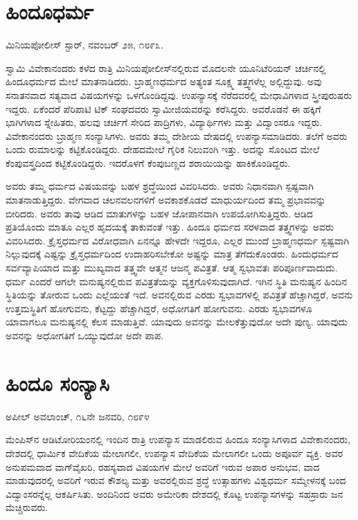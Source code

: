 \section{ಹಿಂದೂಧರ್ಮ}

\begin{flushright}
ಮಿನಿಯಪೋಲೀಸ್ ಸ್ಟಾರ್, ನವಂಬರ್ ೨೫, ೧೮೯೩.
\end{flushright}

 ಸ್ವಾಮಿ ವಿವೇಕಾನಂದರು ಕಳೆದ ರಾತ್ರಿ ಮಿನಿಯಪೋಲೀಸ್‍ನಲ್ಲಿರುವ ಮೊದಲನೇ ಯೂನಿಟೆರಿಯನ್ ಚರ್ಚಿನಲ್ಲಿ ಹಿಂದೂಧರ್ಮದ ಮೇಲೆ ಮಾತನಾಡಿದರು. ಬ್ರಾಹ್ಮಣಧರ್ಮದ ಅತ್ಯಂತ ಸೂಕ್ಷ್ಮ ತತ್ತ್ವಗಳೆಲ್ಲ ಅಲ್ಲಿದ್ದುವು. ಅವು ಸನಾತನವಾದ ಸತ್ಯವಾದ ವಿಷಯಗಳನ್ನು ಒಳಗೊಂಡಿದ್ದವು. ಉಪನ್ಯಾಸಕ್ಕೆ ನೆರೆದವರಲ್ಲಿ ಮೇಧಾವಿಗಳಾದ ಸ್ತ್ರೀಪುರುಷರು ಇದ್ದರು. ಏಕೆಂದರೆ ಪೆರಿಪಾಟಿ ಟಿಕ್ ಸಂಘದವರು ಸ್ವಾಮೀಜಿಯವರನ್ನು ಕರೆಸಿದ್ದರು. ಅವರೊಡನೆ ಈ ಹಕ್ಕಿಗೆ ಭಾಗಿಗಳಾದ ಸ್ನೇಹಿತರು, ಹಲವು ಚರ್ಚಿಗೆ ಸೇರಿದ ಪಾದ್ರಿಗಳು, ವಿದ್ಯಾರ್ಥಿಗಳು ಮತ್ತು ವಿದ್ವಾಂಸರೂ ಇದ್ದರು. ವಿವೇಕಾನಂದರು ಬ್ರಾಹ್ಮಣ ಸಂನ್ಯಾಸಿಗಳು. ಅವರು ತಮ್ಮ ದೇಶೀಯ ವೇಷದಲ್ಲಿ ಉಪನ್ಯಾಸಮಾಡಿದರು. ತಲೆಗೆ ಅವರು ಒಂದು ರುಮಾಲನ್ನು ಕಟ್ಟಿಕೊಂಡಿದ್ದರು. ದೇಹದಮೇಲೆ ಗೈರಿಕ ನಿಲುವಂಗಿ ಇತ್ತು. ಅದನ್ನು ಸೊಂಟದ ಮೇಲೆ ಕೆಂಪುವಸ್ತ್ರದಿಂದ ಕಟ್ಟಿಕೊಂಡಿದ್ದರು. ಇದರೊಳಗೆ ಕೆಂಪುಬಣ್ಣದ ಶರಾಯಿಯನ್ನು ಹಾಕಿಕೊಂಡಿದ್ದರು. 

 ಅವರು ತಮ್ಮ ಧರ್ಮದ ವಿಷಯವನ್ನು ಬಹಳ ಶ್ರದ್ಧೆಯಿಂದ ವಿವರಿಸಿದರು. ಅವರು ನಿಧಾನವಾಗಿ ಸ್ಪಷ್ಟವಾಗಿ ಮಾತನಾಡುತ್ತಿದ್ದರು. ವೇಗವಾದ ಚಲನವಲನಗಳಿಗೆ ಅವಕಾಶಕೊಡದೆ ಮಾಧುರ್ಯದಿಂದ ತಮ್ಮ ಪ್ರಭಾವವನ್ನು ಬೀರಿದರು. ಅವರು ತಾವು ಆಡಿದ ಮಾತುಗಳನ್ನು ಬಹಳ ಜೋಪಾನವಾಗಿ ಉಪಯೋಗಿಸುತ್ತಿದ್ದರು. ಆಡಿದ ಪ್ರತಿಯೊಂದು ಮಾತೂ ಎಲ್ಲರ ಹೃದಯಕ್ಕೆ ತಾಕುವಂತೆ ಇತ್ತು. ಹಿಂದೂ ಧರ್ಮದ ಸರಳವಾದ ತತ್ತ್ವಗಳನ್ನು ಅವರು ವಿವರಿಸಿದರು. ಕ್ರೈಸ್ತಧರ್ಮದ ವಿರೋಧವಾಗಿ ಏನನ್ನೂ ಹೇಳದೇ ಇದ್ದರೂ, ಎಲ್ಲರ ಮುಂದೆ ಬ್ರಾಹ್ಮಣಧರ್ಮ ಸ್ಪಷ್ಟವಾಗಿ ನಿಲ್ಲುವುದಕ್ಕೆ ಎಷ್ಟನ್ನು ಕ್ರೈಸ್ತಧರ್ಮದಿಂದ ಉದಾಹರಿಸಬೇಕೋ ಅಷ್ಟನ್ನು ಮಾತ್ರ ತೆಗೆದುಕೊಂಡರು. ಹಿಂದುಧರ್ಮದ ಸರ್ವವ್ಯಾಪಿಯಾದ ಮತ್ತು ಮುಖ್ಯವಾದ ತತ್ತ್ವವೇ ಆತ್ಮನ ಆಜನ್ಮ ಪವಿತ್ರತೆ. ಆತ್ಮ ಸ್ವಭಾವತಃ ಪರಿಪೂರ್ಣವಾದುದು. ಧರ್ಮ ಎಂದರೆ ಆಗಲೇ ಮನುಷ್ಯನಲ್ಲಿರುವ ಪವಿತ್ರತೆಯನ್ನು ವ್ಯಕ್ತಗೊಳಿಸುವುದಾಗಿದೆ. ಇಗಿನ ಸ್ಥಿತಿ ಮನುಷ್ಯನ ಹಿಂದಿನ ಸ್ಥಿತಿಯನ್ನು ತೋರುವ ಒಂದು ಎಲ್ಲೆಯಂತೆ ಇದೆ. ಅವನಲ್ಲಿರುವ ಎರಡು ಸ್ವಭಾವಗಳಲ್ಲಿ ಪವಿತ್ರತೆ ಹೆಚ್ಚಾಗಿದ್ದರೆ, ಅವನು ಉತ್ತಮಸ್ಥಿತಿಗೆ ಹೋಗುವನು, ಕೆಟ್ಟದ್ದು ಹೆಚ್ಚಾಗಿದ್ದರೆ, ಅಧೋಗತಿಗೆ ಹೋಗುವನು. ಎರಡು ಸ್ವಭಾವಗಳೂ ಯಾವಾಗಲೂ ಮನುಷ್ಯನಲ್ಲಿ ಕೆಲಸ ಮಾಡುತ್ತಿವೆ. ಯಾವುದು ಅವನನ್ನು ಮೇಲಕೆತ್ತುವುದೋ ಅದೇ ಪುಣ್ಯ. ಯಾವುದು ಅವನನ್ನು ಅಧೋಗತಿಗೆ ಒಯ್ಯುವುದೋ ಅದೇ ಪಾಪ.


\section{ಹಿಂದೂ ಸಂನ್ಯಾಸಿ}

\begin{flushright}
ಅಪೀಲ್ ಅವಲಾಂಚ್, ೧೬ನೇ ಜನವರಿ, ೧೮೯೪
\end{flushright}

 ಮೆಂಪಿಸ್‍ನ ಆಡಿಟೋರಿಯಂನಲ್ಲಿ ಇಂದಿನ ರಾತ್ರಿ ಉಪನ್ಯಾಸ ಮಾಡಲಿರುವ ಹಿಂದೂ ಸಂನ್ಯಾಸಿಗಳಾದ ವಿವೇಕಾನಂದರು, ದೇಶದಲ್ಲಿ ಧಾರ್ಮಿಕ ವೇದಿಕೆಯ ಮೇಲಾಗಲೀ, ಉಪನ್ಯಾಸ ವೇದಿಕೆಯ ಮೇಲಾಗಲೀ ಒಂದು ಅಪೂರ್ವ ವ್ಯಕ್ತಿ. ಅವರ ಅನುಪಮವಾದ ವಾಗ್‍ವೈಖರಿ, ರಹಸ್ಯವಾದ ವಿಷಯಗಳ ಮೇಲೆ ಅವರಿಗೆ ಇರುವ ಅಪಾರ ಅನುಭವ, ವಾದ ಮಾಡುವುದರಲ್ಲಿ ಅವರಿಗೆ ಇರುವ ಕೌಶಲ್ಯ ಮತ್ತು ಅವರಲ್ಲಿರುವ ಶ್ರದ್ಧೆ ಉತ್ಸಾಹಗಳು ವಿಶ್ವಧರ್ಮ ಸಮ್ಮೇಳನಕ್ಕೆ ಬಂದ ವಿದ್ವಾಂಸರನ್ನೆಲ್ಲ ಆಕರ್ಷಿಸಿತು. ಅಂದಿನಿಂದ ಅವರು ಅಮೇರಿಕಾ ದೇಶದಲ್ಲಿ ಕೊಟ್ಟ ಉಪನ್ಯಾಸಗಳನ್ನು ಸಹಸ್ರಾರು ಜನ ಮೆಚ್ಚಿರುವರು. 

